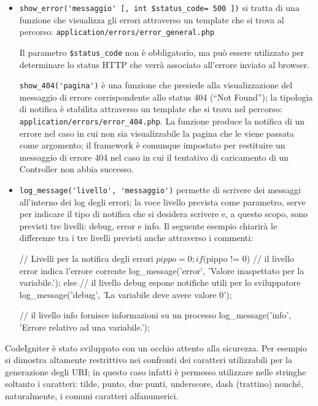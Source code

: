 \begin{itemize}
\item \verb|show_error('messaggio' [, int $status_code= 500 ])| si tratta di una funzione che visualizza gli errori attraverso un template che si trova al percorso: \verb|application/errors/error_general.php|

Il parametro \verb|$status_code| non è obbligatorio, ma può essere utilizzato per determinare lo status \ac{HTTP} che verrà associato all'errore inviato al browser.

\verb|show_404('pagina')| è una funzione che presiede alla visualizzazione del messaggio di errore corrispondente allo status 404 (``Not Found''); la tipologia di notifica è stabilita attraverso un template che si trova nel percorso: \verb|application/errors/error_404.php|. La funzione produce la notifica di un errore nel caso in cui non sia visualizzabile la pagina che le viene passata come argomento; il framework è comunque impostato per restituire un messaggio di errore 404 nel caso in cui il tentativo di caricamento di un Controller non abbia successo.

\item \verb|log_message('livello', 'messaggio')| permette di scrivere dei messaggi all'interno dei log degli errori; la voce livello prevista come parametro, serve per indicare il tipo di notifica che si desidera scrivere e, a questo scopo, sono previsti tre livelli: debug, error e info. Il seguente esempio chiarirà le differenze tra i tre livelli previsti anche attraverso i commenti:

\begin{code}
// Livelli per la notifica degli errori
$pippo = 0; 
if ($pippo != 0)
{
  // il livello error indica l'errore corrente
  log_message('error', 'Valore inaspettato per la variabile.');
}
else
{
  // il livello debug espone notifiche utili per lo sviluppatore 
  log_message('debug', 'La variabile deve avere valore 0');
}

// il livello info fornisce informazioni su un processo
log_message('info', 'Errore relativo ad una variabile.');
\end{code}

\end{itemize}

CodeIgniter è stato sviluppato con un occhio attento alla sicurezza. Per esempio si dimostra altamente restrittivo nei confronti dei caratteri utilizzabili per la generazione degli \ac{URI}; in questo caso infatti è permesso utilizzare nelle stringhe soltanto i caratteri: tilde, punto, due punti, underscore, dash (trattino) nonché, naturalmente, i comuni caratteri alfanumerici.

